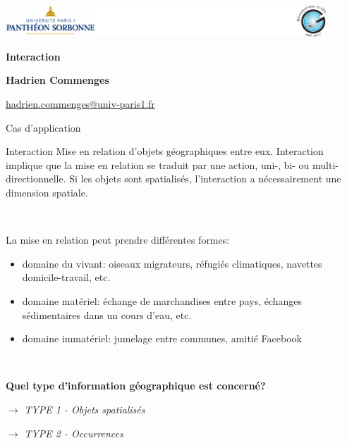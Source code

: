 \graphicspath{{IMAGE/}}

\begin{frame}

\includegraphics[width=12cm]{Logos.pdf}

\vfill

\begin{center}

\vspace*{1.5cm}

\LARGE
\textbf{Interaction}

\vspace*{2.5cm}

\large

\textbf{Hadrien Commenges}

{\small

\vspace*{0.1cm}

\url{hadrien.commenges@univ-paris1.fr}}

\end{center}

\end{frame}



\begin{frame}{Cas d'application}

\begin{block}{Interaction}
Mise en relation d'objets géographiques entre eux. Interaction implique que la mise en relation se traduit par une action, uni-, bi- ou multi-directionnelle. Si les objets sont spatialisés, l'interaction a nécessairement une dimension spatiale.
\end{block}

~

La mise en relation peut prendre différentes formes:

\begin{itemize}
\item domaine du vivant: oiseaux migrateurs, réfugiés climatiques, navettes domicile-travail, etc.
\item domaine matériel: échange de marchandises entre pays, échanges sédimentaires dans un cours d'eau, etc.
\item domaine immatériel: jumelage entre communes, amitié Facebook
\end{itemize}


~

\textbf{Quel type d'information géographique est concerné?}

$\rightarrow$ \textit{TYPE 1 - Objets spatialisés}

$\rightarrow$ \textit{TYPE 2 - Occurrences}

\end{frame}




